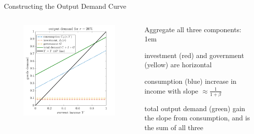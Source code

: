 \documentclass[11pt,aspectratio=43]{beamer}
\let\olditemize=\itemize
\let\endolditemize=\enditemize
\renewenvironment{itemize}{\olditemize \itemsep1em}{\endolditemize}
\theoremstyle{definition}
\begin{document}
\begin{frame}{Constructing the Output Demand Curve}
\label{slide:Constructing_the_Output_Demand_Curve}
    \begin{columns}
        \begin{column}{0.5\textwidth}
            \begin{figure}
                \includegraphics[width=\textwidth]{./figures/OutputDemand.png}
            \end{figure}


        \end{column}
        \begin{column}{0.5\textwidth}
            Aggregate all three components:
            \begin{itemize}
                \item investment (red) and government (yellow) are horizontal
                \item consumption (blue) increase in income with slope $ \approx \frac{1}{1+\beta} $
                \item total output demand (green) gain the slope from consumption, and is the sum of all three
            \end{itemize}
        \end{column}
    \end{columns}
\end{frame}
\end{document}
